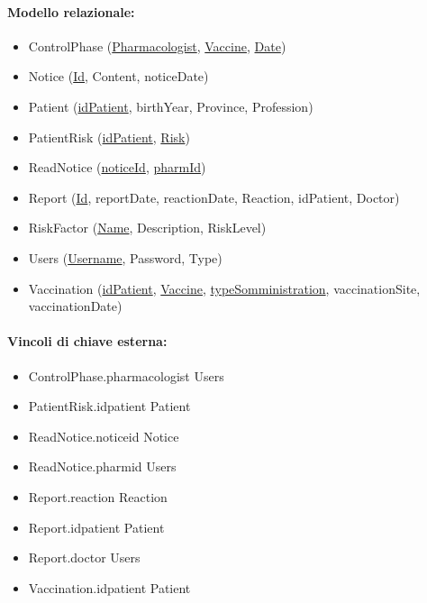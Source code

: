 \documentclass[11pt]{article}
\begin{document}
    \paragraph*{Modello relazionale:}
        \begin{itemize}
            \item ControlPhase (\underline{Pharmacologist}, \underline{Vaccine}, \underline{Date})
            \item Notice (\underline{Id}, Content, noticeDate)
            \item Patient (\underline{idPatient}, birthYear, Province, Profession)
            \item PatientRisk (\underline{idPatient}, \underline{Risk})
            \item ReadNotice (\underline{noticeId}, \underline{pharmId})
            \item Report (\underline{Id}, reportDate, reactionDate, Reaction, idPatient, Doctor)
            \item RiskFactor (\underline{Name}, Description, RiskLevel)
            \item Users (\underline{Username}, Password, Type)
            \item Vaccination (\underline{idPatient}, \underline{Vaccine}, \underline{typeSomministration}, vaccinationSite, vaccinationDate)
        \end{itemize}

    \paragraph*{Vincoli di chiave esterna:}
        \begin{itemize}
            \item ControlPhase.pharmacologist \textrightarrow Users
            \item PatientRisk.idpatient \textrightarrow Patient
            \item ReadNotice.noticeid \textrightarrow Notice
            \item ReadNotice.pharmid \textrightarrow Users
            \item Report.reaction \textrightarrow Reaction
            \item Report.idpatient \textrightarrow Patient
            \item Report.doctor \textrightarrow Users
            \item Vaccination.idpatient \textrightarrow Patient
        \end{itemize}
\end{document}
